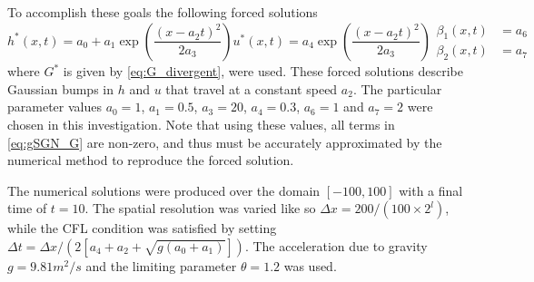 \documentclass[10pt]{elsarticle}
\begin{document}
To accomplish these goals the following forced solutions
\begin{subequations}
	\begin{equation}
	h^*(x,t) = a_0 + a_1 \exp\left( \dfrac{\left(x - a_2 t\right)^2}{2 a_3} \right)
	\end{equation}
	\begin{equation}
	u^*(x,t) = a_4 \exp\left( \dfrac{\left(x - a_2 t\right)^2}{2 a_3} \right)
	\end{equation}
	\begin{align}
	\beta_1(x,t) &= a_6 \\
	\beta_2(x,t) &= a_7
	\end{align}
\end{subequations}
where $G^*$ is given by \eqref{eq:G_divergent}, were used. These forced solutions describe Gaussian bumps in $h$ and $u$ that travel at a constant speed $a_2$. The particular parameter values $a_0=1$, $a_1=0.5$, $a_3=20$, $a_4=0.3$, $a_6 = 1$ and $a_7=2$ were chosen in this investigation. Note that using these values, all terms in \eqref{eq:gSGN_G} are non-zero, and thus must be accurately approximated by the numerical method to reproduce the forced solution.

The numerical solutions were produced over the domain $\left[-100,100\right]$ with a final time of $t=10$. The spatial resolution was varied like so $\Delta x = 200 / (100 \times 2^{l})$, while the CFL condition was satisfied by setting $\Delta t = \Delta x  / \left( 2 \left[a_4 + a_2+ \sqrt{g \left(a_0 + a_1\right)}\right] \right)$. The acceleration due to gravity $g=9.81m^2/s$ and the limiting parameter $\theta = 1.2$ was used.
\end{document}
